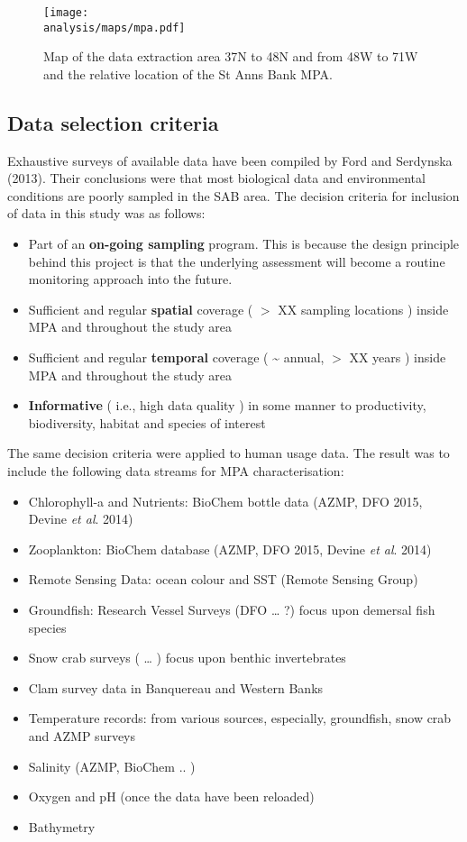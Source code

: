 \documentclass[letterpaper,portrait,11pt]{scrartcl}
\numberwithin{equation}{section}		%
\numberwithin{figure}{section}		%
\numberwithin{table}{section}				%
\newcommand{\ecomod}{\string~/ecomod_data/}   %
\newcommand{\analysis}{\ecomod/mpa/analysis/}   %
\begin{document}
\begin{figure}[h]
  \label{fig:SAB}
  \centering
  \texttt{[image: \\analysis/maps/mpa.pdf]}
  \caption{Map of the data extraction area 37N to 48N and from 48W to 71W and the relative location of the St Anns Bank MPA.}
\end{figure}


\subsection{Data selection criteria}
Exhaustive surveys of available data have been compiled by Ford and Serdynska (2013). Their conclusions were that most biological data and environmental conditions are poorly sampled in the SAB area. 
The decision criteria for inclusion of data in this study was as follows:

\begin{itemize}
	\item Part of an \textbf{on-going sampling }program. This is because the design principle behind this project is that the underlying  assessment will become a routine monitoring approach into the future.
  \item	Sufficient and regular \textbf{spatial} coverage ( $>$ XX sampling locations ) inside MPA and throughout the study area
  \item Sufficient and regular \textbf{temporal} coverage ( \~{} annual, $>$ XX years ) inside MPA and throughout the study area
  \item \textbf{Informative} ( i.e., high data quality ) in some manner to productivity, biodiversity, habitat and species of interest
\end{itemize}

The same decision criteria were applied to human usage data. The result was to include the following data streams for MPA characterisation:

\begin{itemize}
	\item Chlorophyll-a and Nutrients: BioChem bottle data (AZMP, DFO 2015, Devine \textit{et al}. 2014) 
  \item Zooplankton: BioChem database (AZMP, DFO 2015, Devine \textit{et al}. 2014) 
  \item Remote Sensing Data: ocean colour and SST (Remote Sensing Group)
  \item Groundfish: Research Vessel Surveys (DFO \ldots{} ?)  focus upon demersal fish species
  \item Snow crab surveys ( \ldots{} ) focus upon benthic invertebrates
  \item Clam survey data in Banquereau and Western Banks
  \item Temperature records: from various sources, especially, groundfish, snow crab and AZMP surveys
  \item Salinity (AZMP, BioChem .. )
  \item Oxygen and pH (once the data have been reloaded)
  \item Bathymetry
\end{itemize}
\end{document}
